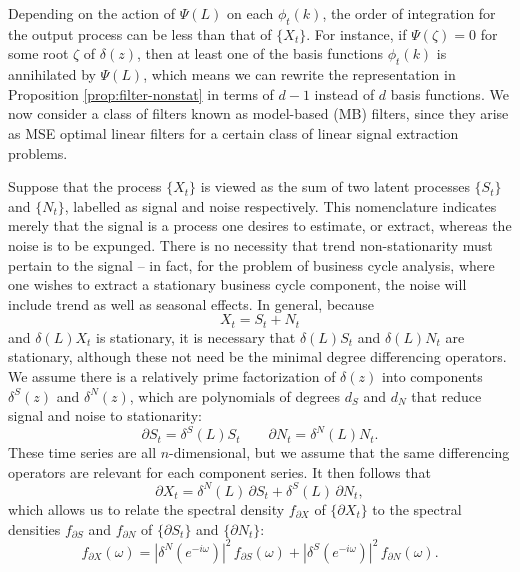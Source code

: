 \documentclass[a4paper]{book}
\begin{document}
  
Depending on the action of $\Psi (L) $ on each $\phi_t (k)$, the order of
 integration for the output process can be less than that of $\{ X_t \}$.
 For instance, if $\Psi (\zeta) = 0$ for some root $\zeta$ of $\delta (z)$,
  then at least one of the basis functions $\phi_t (k)$ is annihilated by
   $\Psi (L)$, which means we can rewrite the representation in 
   Proposition \ref{prop:filter-nonstat} in terms of $d-1$ instead of $d$ basis
   functions.  We now consider a class of filters known as model-based (MB) filters,
  since they arise as MSE optimal linear filters for a certain class of linear
  signal extraction problems.
  
  Suppose that the process $\{ X_t \}$ is viewed as the sum of two latent processes
  $\{ S_t \}$ and $\{ N_t \}$, labelled as signal and noise respectively.
   This nomenclature indicates merely that the signal is a process one desires
  to estimate, or extract, whereas the noise is to be expunged.  There is no necessity
  that trend non-stationarity must pertain to the signal -- in fact, for the problem
  of business cycle analysis, where one wishes to extract a stationary business cycle
  component, the noise will include trend as well as seasonal effects.
  In general, because
\begin{equation}
\label{eq:signal-noise-decomp}
 X_t = S_t + N_t
\end{equation}
 and $\delta (L) X_t$ is stationary, it is necessary that $\delta (L) S_t$ and 
  $\delta (L) N_t$ are stationary, although these not need be the minimal degree
  differencing operators.  We assume there is a relatively prime factorization of
  $\delta (z)$ into components $\delta^S (z)$ and $\delta^N (z)$, which are polynomials
  of degrees $d_S$ and $d_N$ that reduce signal and noise to stationarity:
\[
  \partial S_t = \delta^S (L) S_t \qquad \partial N_t = \delta^N (L) N_t.
\]
  These time series are all $n$-dimensional, but we assume that the same differencing
  operators are relevant for each component series.  It then follows that
\begin{equation}
\label{eq:diff-x.signoise}
 \partial X_t = \delta^N (L) \, \partial S_t + \delta^S (L) \, \partial N_t,
\end{equation}
 which allows us to relate the spectral density $f_{\partial X}$ of $\{ \partial X_t \}$
 to the spectral densities $f_{\partial S}$
  and $f_{\partial N}$ of $\{ \partial S_t \}$ and $\{ \partial N_t \}$:
 \begin{equation}
 \label{eq:sig-and-noise.sdf}
 f_{\partial X} (\omega) = {| \delta^N (e^{-i \omega}) |}^2 \, f_{\partial S} (\omega)
  + {| \delta^S (e^{-i \omega}) |}^2 \, f_{\partial N} (\omega).
 \end{equation}
\end{document}
